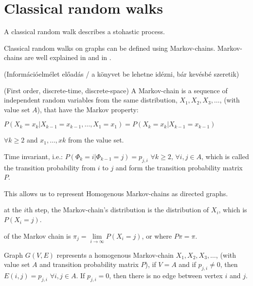 \chapter{Classical random walks}

A classical random walk describes a stohastic process.


Classical random walks on graphs can be defined using Markov-chains. Markov-chains
are well explained in \cite{BreimanProbability} and in \cite{XiaReview}.


(Információelmélet előadás / a könyvet be lehetne idézni, bár kevésbé szeretik)

 (First order, discrete-time, discrete-space) A Markov-chain is a sequence of independent random variables from the same distribution, $X_1, X_2, X_3, \dots$, (with value set $A$), that have the Markov property:


$P(X_k = x_k | X_{k-1} = x_{k-1}, \dots, X_1 = x_1) = P(X_k = x_k | X_{k-1} = x_{k-1})$

$\forall k\geq{}2$ and $x_{1},\dots, x{k}$ from the value set.

 Time invariant, i.e.:
$P(\Phi_k = i | \Phi_{k-1} = j) = p_{j,i}$ $\forall k\geq{}2$, $\forall i,j \in{} A$, which is called the transition probability from $i$ to $j$ and form the transition probability matrix $P$.

This allows us to represent Homogenous Markov-chains as directed graphs.

 at the $i$th step, the Markov-chain's distribution is the distribution of $X_i$, which is $P(X_i = j)$.

 of the Markov chain is $\pi_{j} = \lim\limits_{i \to \infty} P(X_i = j)$, or where $P\pi = \pi$.

Graph $G(V,E)$ represents a homogenous Markov-chain $X_1, X_2, X_3, \dots$, (with value set $A$ and transition probability matrix $P$), if $V=A$ and if $p_{j,i} \neq{} 0$, then $E(i,j) = p_{j,i}$ $\forall{}i,j\in{}A$. If $p_{j,i} = 0$, then there is no edge between vertex $i$ and $j$.

